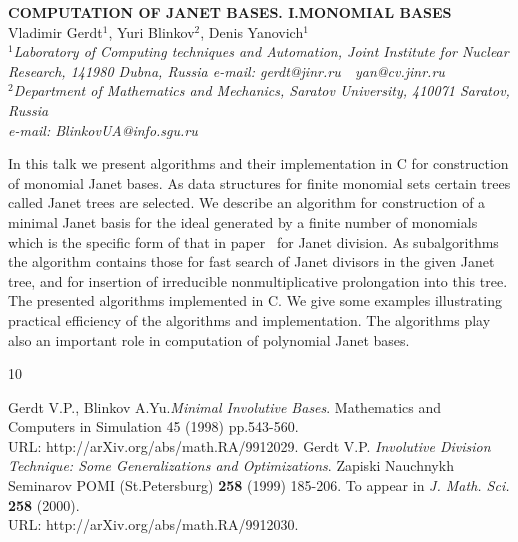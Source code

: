 \documentclass[11pt, draft]{article}
\begin{document}

\begin{center}
{\bf
COMPUTATION OF JANET BASES. I.MONOMIAL BASES}\\
\vspace {0.3cm}
{Vladimir Gerdt$^1$, Yuri Blinkov$^2$, Denis Yanovich$^1$}\\
{\it \small$^1$Laboratory of Computing techniques and Automation, Joint Institute for Nuclear
Research, 141980 Dubna, Russia e-mail: gerdt@jinr.ru\ \ yan@cv.jinr.ru \\
$^2$Department of Mathematics and Mechanics, Saratov University, 410071 Saratov, Russia \\
e-mail: BlinkovUA@info.sgu.ru}
\end{center}
\vspace {1.0cm}
In this talk we present algorithms and their implementation in C
for construction of monomial Janet bases. As data structures for
finite monomial sets certain trees called Janet trees are selected.
We describe an algorithm for construction of a minimal Janet basis for the
ideal generated by a finite number of monomials which is the
specific form of that in paper~\cite{GB2,G98} for Janet division.
As subalgorithms the algorithm contains those for fast search of Janet
divisors in the given Janet tree, and for insertion of irreducible
nonmultiplicative prolongation into this tree. The presented algorithms
implemented in C. We give some examples illustrating practical
efficiency of the algorithms and implementation. The algorithms
play also an important role in computation of polynomial Janet bases.
\vskip 0.5cm

\begin{thebibliography}{10}

 Gerdt V.P., Blinkov A.Yu.{\em Minimal Involutive Bases}.
 Mathematics and Computers in Simulation 45 (1998) pp.543-560. \\
 URL: http://arXiv.org/abs/math.RA/9912029.
 Gerdt V.P. {\em Involutive Division Technique: Some
 Generalizations and Optimizations}. Zapiski Nauchnykh Seminarov POMI (St.Petersburg)
 {\bf 258} (1999) 185-206. To appear in {\em J. Math. Sci.} {\bf 258}
(2000).\\  URL: http://arXiv.org/abs/math.RA/9912030.

\end{thebibliography}
\end{document}
